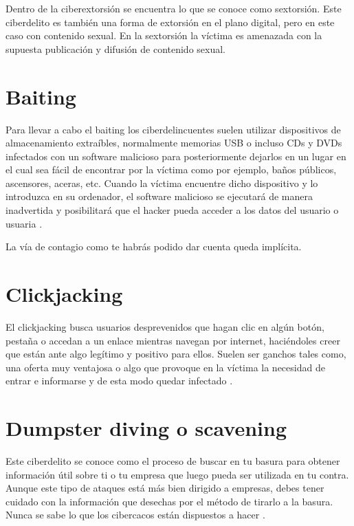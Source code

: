 \documentclass[
  spanish,
  a4paper,
  openany]{book}
\begin{document}
Dentro de la ciberextorsión se encuentra lo que se conoce como sextorsión. Este ciberdelito es también una forma de extorsión en el plano digital, pero en este caso con contenido sexual. En la sextorsión la víctima es amenazada con la supuesta publicación y difusión de contenido sexual.

\hypertarget{baiting}{%
\section{Baiting}\label{baiting}}

Para llevar a cabo el baiting los ciberdelincuentes suelen utilizar dispositivos de almacenamiento extraíbles, normalmente memorias USB o incluso CDs y DVDs infectados con un software malicioso para posteriormente dejarlos en un lugar en el cual sea fácil de encontrar por la víctima como por ejemplo, baños públicos, ascensores, aceras, etc. Cuando la víctima encuentre dicho dispositivo y lo introduzca en su ordenador, el software malicioso se ejecutará de manera inadvertida y posibilitará que el hacker pueda acceder a los datos del usuario o usuaria \citep{baiting}.

La vía de contagio como te habrás podido dar cuenta queda implícita.

\hypertarget{clickjacking}{%
\section{Clickjacking}\label{clickjacking}}

El clickjacking busca usuarios desprevenidos que hagan clic en algún botón, pestaña o accedan a un enlace mientras navegan por internet, haciéndoles creer que están ante algo legítimo y positivo para ellos. Suelen ser ganchos tales como, una oferta muy ventajosa o algo que provoque en la víctima la necesidad de entrar e informarse y de esta modo quedar infectado \citep{WIKI-clickjacking}.

\hypertarget{dumpster-diving-o-scavening}{%
\section{Dumpster diving o scavening}\label{dumpster-diving-o-scavening}}

Este ciberdelito se conoce como el proceso de buscar en tu basura para obtener información útil sobre ti o tu empresa que luego pueda ser utilizada en tu contra. Aunque este tipo de ataques está más bien dirigido a empresas, debes tener cuidado con la información que desechas por el método de tirarlo a la basura. Nunca se sabe lo que los cibercacos están dispuestos a hacer \citep{WIKI-dumpster-diving}.
\end{document}
